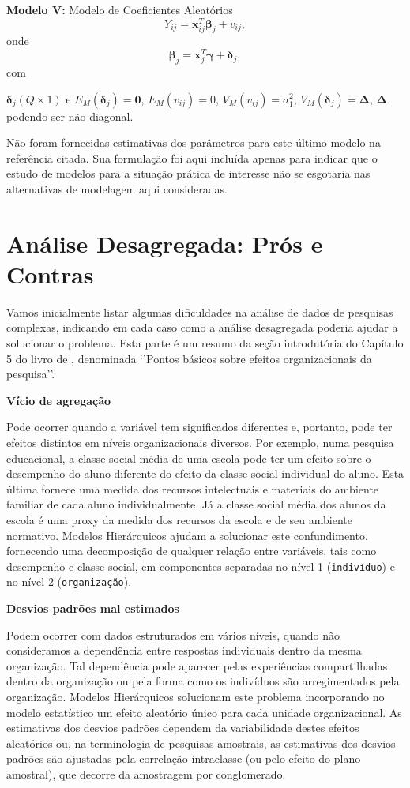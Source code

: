 \documentclass[]{book}
\theoremstyle{definition}
\theoremstyle{definition}
\theoremstyle{definition}
\theoremstyle{remark}
\begin{document}
\textbf{Modelo V:} Modelo de Coeficientes Aleatórios \[
Y_{ij}=\mathbf{x}_{ij}^{T}\mathbf{\beta }_{j}+v_{ij},
\] onde \[
\mathbf{\beta }_{j}=\mathbf{x}_{j}^{T}\mathbf{\gamma }+\mathbf{\delta }_{j},
\] com

\(\mathbf{\delta }_{j}(Q\times 1)\) e
\(E_{M}\left( \mathbf{\delta}_{j}\right) =\mathbf{0}\),
\(E_{M}\left( v_{ij}\right) =0\),
\(V_{M}\left(v_{ij}\right) =\sigma _{1}^{2}\),
\(V_{M}\left( \mathbf{\delta }_{j}\right) =\mathbf{\Delta }\),
\(\mathbf{\Delta}\) podendo ser não-diagonal.

Não foram fornecidas estimativas dos parâmetros para este último modelo
na referência citada. Sua formulação foi aqui incluída apenas para
indicar que o estudo de modelos para a situação prática de interesse não
se esgotaria nas alternativas de modelagem aqui consideradas.

\section{Análise Desagregada: Prós e
Contras}\label{analise-desagregada-pros-e-contras}

Vamos inicialmente listar algumas dificuldades na análise de dados de
pesquisas complexas, indicando em cada caso como a análise desagregada
poderia ajudar a solucionar o problema. Esta parte é um resumo da seção
introdutória do Capítulo 5 do livro de \citep{bryk}, denominada `'Pontos
básicos sobre efeitos organizacionais da pesquisa''.

\textbf{Vício de agregação}

Pode ocorrer quando a variável tem significados diferentes e, portanto,
pode ter efeitos distintos em níveis organizacionais diversos. Por
exemplo, numa pesquisa educacional, a classe social média de uma escola
pode ter um efeito sobre o desempenho do aluno diferente do efeito da
classe social individual do aluno. Esta última fornece uma medida dos
recursos intelectuais e materiais do ambiente familiar de cada aluno
individualmente. Já a classe social média dos alunos da escola é uma
proxy da medida dos recursos da escola e de seu ambiente normativo.
Modelos Hierárquicos ajudam a solucionar este confundimento, fornecendo
uma decomposição de qualquer relação entre variáveis, tais como
desempenho e classe social, em componentes separadas no nível 1
(\texttt{indivíduo}) e no nível 2 (\texttt{organização}).

\textbf{Desvios padrões mal estimados}

Podem ocorrer com dados estruturados em vários níveis, quando não
consideramos a dependência entre respostas individuais dentro da mesma
organização. Tal dependência pode aparecer pelas experiências
compartilhadas dentro da organização ou pela forma como os indivíduos
são arregimentados pela organização. Modelos Hierárquicos solucionam
este problema incorporando no modelo estatístico um efeito aleatório
único para cada unidade organizacional. As estimativas dos desvios
padrões dependem da variabilidade destes efeitos aleatórios ou, na
terminologia de pesquisas amostrais, as estimativas dos desvios padrões
são ajustadas pela correlação intraclasse (ou pelo efeito do plano
amostral), que decorre da amostragem por conglomerado.
\end{document}
